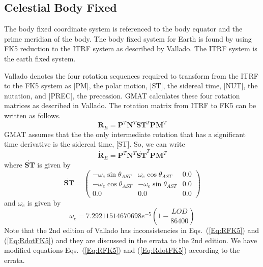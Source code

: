 {%
\subsection{Celestial Body Fixed}  \label{Sec:Fixed} 

The body fixed coordinate system is referenced to the body equator
and the prime meridian of the body.  The body fixed system for
Earth is found  by using FK5 reduction to the ITRF system as
described by Vallado.  The ITRF system is the earth fixed system.

Vallado denotes the four rotation sequences required to transform
from the ITRF to the FK5 system as [PM], the polar motion, [ST],
the sidereal time, [NUT], the nutation, and [PREC], the
precession. GMAT calculates these four rotation matrices as
described in Vallado.  The rotation matrix from ITRF to FK5 can be
written as follows.
%
\begin{equation}
     \mathbf{R}_{Ii}  = \mathbf{P}^T\mathbf{N}^T\mathbf{ST}^T\mathbf{PM}^T
     \label{Eq:RFK5}
\end{equation}
%
GMAT assumes that the the only intermediate rotation that has a
significant time derivative is the sidereal time, [ST].  So, we
can write
%
\begin{equation}
     \dot{\mathbf{R}}_{Ii}  = \mathbf{P}^T\mathbf{N}^T\dot{\mathbf{ST}}^T\mathbf{PM}^T \label{Eq:RdotFK5}
\end{equation}
%
where $\dot{\mathbf{ST}}$ is given by
%
\begin{equation}
    \dot{\mathbf{ST}} =   \begin{pmatrix}
     -\omega_e\sin{\theta_{AST}}  & \omega_e\cos{\theta_{AST}} & 0.0\\
     -\omega_e\cos{\theta_{AST}} & -\omega_e\sin{\theta_{AST}} & 0.0\\
     0.0 & 0.0 & 0.0
     \end{pmatrix}
\end{equation}
%
and $\omega_e$ is given by
%
\begin{equation}
    \omega_e = 7.29211514670698e^{-5} \left( 1 - \frac{LOD}{86400}  \right)
\end{equation}
%
Note that the 2nd edition of Vallado\cite{vallado2} has
inconsistencies in Eqs.~(\ref{Eq:RFK5}) and (\ref{Eq:RdotFK5}) and
they are discussed in the errata to the 2nd edition.  We have
modified equations Eqs.~(\ref{Eq:RFK5}) and (\ref{Eq:RdotFK5})
according to the errata.

}
